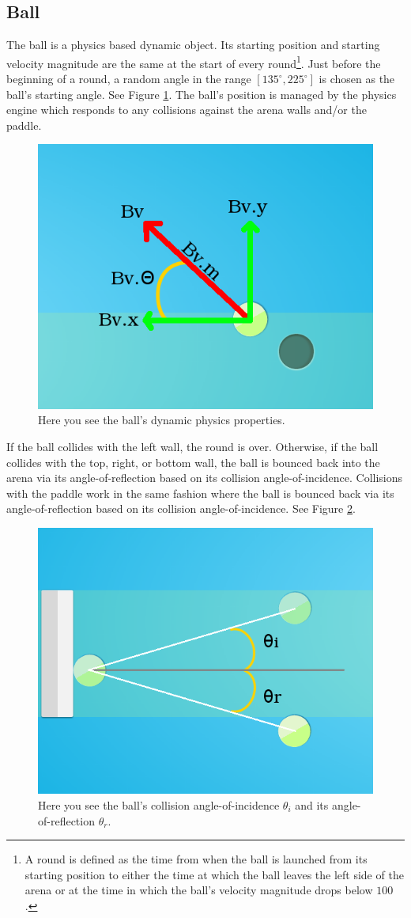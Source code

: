 \documentclass[a4paper,10pt]{article}
\begin{document}
\subsection{Ball}

The ball is a physics based dynamic object. Its starting position and starting velocity magnitude are the same at the start of every round\footnote{A round is defined as the time from when the ball is launched from its starting position to either the time at which the ball leaves the left side of the arena or at the time in which the ball's velocity magnitude drops below $100$.}. Just before the beginning of a round, a random angle in the range $[135^\circ,225^\circ]$ is chosen as the ball's starting angle. See Figure \ref{fig:ball}. The ball's position is managed by the physics engine which responds to any collisions against the arena walls and/or the paddle.

\begin{figure}[H]  
  \centering
  \includegraphics[width=.7\textwidth]{figures/ball.png}
  \caption{Here you see the ball's dynamic physics properties.}
  \label{fig:ball}
\end{figure}

If the ball collides with the left wall, the round is over. Otherwise, if the ball collides with the top, right, or bottom wall, the ball is bounced back into the arena via its angle-of-reflection based on its collision angle-of-incidence. Collisions with the paddle work in the same fashion where the ball is bounced back via its angle-of-reflection based on its collision angle-of-incidence. See Figure \ref{fig:angle}.

\begin{figure}[H]  
  \centering
  \includegraphics[width=.5\textwidth]{figures/angle.png}
  \caption{Here you see the ball's collision angle-of-incidence $\theta_i$ and its angle-of-reflection $\theta_r$.}
  \label{fig:angle}
\end{figure}
\end{document}
